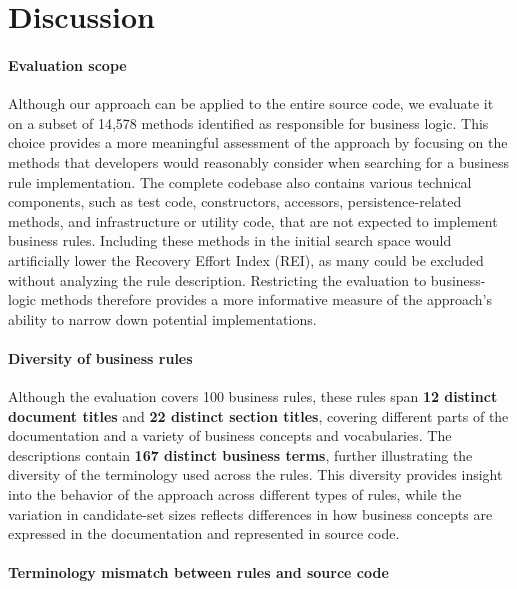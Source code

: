 \section{Discussion}
\label{sec:discussion}

\paragraph{Evaluation scope}\noindent

Although our approach can be applied to the entire source code, we evaluate it on a subset of 14,578 methods identified as responsible for business logic. This choice provides a more meaningful assessment of the approach by focusing on the methods that developers would reasonably consider when searching for a business rule implementation. The complete codebase also contains various technical components, such as test code, constructors, accessors, persistence-related methods, and infrastructure or utility code, that are not expected to implement business rules. Including these methods in the initial search space would artificially lower the Recovery Effort Index (REI), as many could be excluded without analyzing the rule description. Restricting the evaluation to business-logic methods therefore provides a more informative measure of the approach's ability to narrow down potential implementations.

\paragraph{Diversity of business rules}\noindent

Although the evaluation covers 100 business rules, these rules span \textbf{12 distinct document titles} and \textbf{22 distinct section titles}, covering different parts of the documentation and a variety of business concepts and vocabularies. The descriptions contain \textbf{167 distinct business terms}, further illustrating the diversity of the terminology used across the rules. This diversity provides insight into the behavior of the approach across different types of rules, while the variation in candidate-set sizes reflects differences in how business concepts are expressed in the documentation and represented in source code.

\paragraph{Terminology mismatch between rules and source code}\noindent

